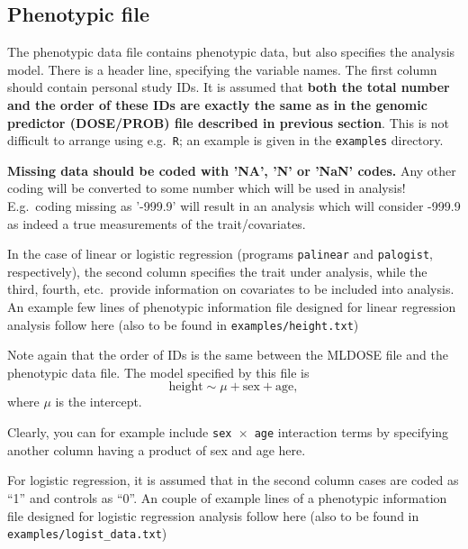 \documentclass[12pt,a4paper]{article}
\begin{document}
\subsection{Phenotypic file}
\label{ssec:phenoin}

The phenotypic data file contains phenotypic data, but also specifies
the analysis model. There is a header line, specifying the variable
names.  The first column should contain personal study IDs. It is
assumed that \textbf{both the total number and the order of these IDs
  are exactly the same as in the genomic predictor (DOSE/PROB) file
  described in previous section}. This is not difficult to arrange
using e.g.~\texttt{R}; an example is given in the \texttt{examples}
directory.

\textbf{Missing data should be coded with 'NA', 'N' or 'NaN' codes.} Any
other coding will be converted to some number which will be used in
analysis! E.g.~coding missing as '-999.9' will result in an analysis which
will consider -999.9 as indeed a true measurements of the trait/covariates.

In the case of linear or logistic regression (programs \texttt{palinear} and
\texttt{palogist}, respectively), the second column specifies the trait
under analysis, while the third, fourth, etc.~provide information on
covariates to be included into analysis.
An example few lines of phenotypic information file designed for
linear regression analysis follow here (also
to be found in \texttt{examples/height.txt})



Note again that the order of IDs is the same between the MLDOSE file
and the phenotypic data file. The model specified by this file is
\begin{equation*}
\textrm{height} \sim \mu + \textrm{sex} + \textrm{age},
\end{equation*}
where $\mu$ is the intercept.

Clearly, you can for example include \texttt{sex $\times$ age} interaction terms by
specifying another column having a product of sex and age here.

For logistic regression, it is assumed that in the second column cases are
coded as ``1'' and controls as ``0''. An couple of example lines of a phenotypic
information file designed for logistic regression analysis follow here (also
to be found in \texttt{examples/logist\_data.txt})


\end{document}
